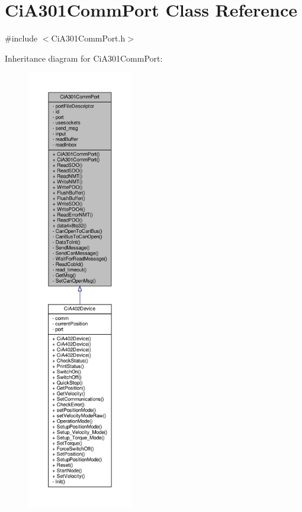 \hypertarget{classCiA301CommPort}{}\section{Ci\+A301\+Comm\+Port Class Reference}
\label{classCiA301CommPort}


{\ttfamily \#include $<$Ci\+A301\+Comm\+Port.\+h$>$}



Inheritance diagram for Ci\+A301\+Comm\+Port\+:
\nopagebreak
\begin{figure}[H]
\begin{center}
\leavevmode
\includegraphics[height=550pt]{classCiA301CommPort__inherit__graph}
\end{center}
\end{figure}


